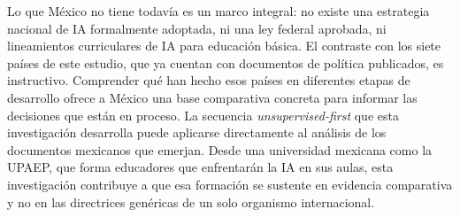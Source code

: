 Lo que México no tiene todavía es un marco integral: no existe una estrategia nacional de IA formalmente adoptada, ni una ley federal aprobada, ni lineamientos curriculares de IA para educación básica. El contraste con los siete países de este estudio, que ya cuentan con documentos de política publicados, es instructivo. Comprender qué han hecho esos países en diferentes etapas de desarrollo ofrece a México una base comparativa concreta para informar las decisiones que están en proceso. La secuencia \textit{unsupervised-first} que esta investigación desarrolla puede aplicarse directamente al análisis de los documentos mexicanos que emerjan. Desde una universidad mexicana como la UPAEP, que forma educadores que enfrentarán la IA en sus aulas, esta investigación contribuye a que esa formación se sustente en evidencia comparativa y no en las directrices genéricas de un solo organismo internacional.
